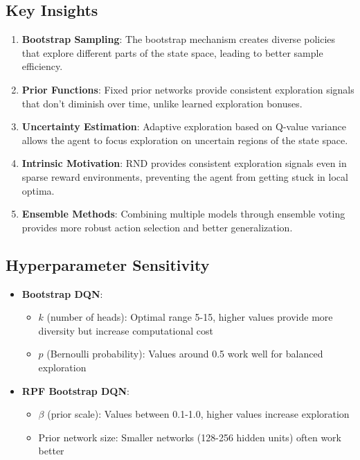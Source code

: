 \documentclass[12pt]{article}
\begin{document}
{{{\subsection{Key Insights}

\begin{enumerate}
    \item \textbf{Bootstrap Sampling}: The bootstrap mechanism creates diverse policies that explore different parts of the state space, leading to better sample efficiency.
    
    \item \textbf{Prior Functions}: Fixed prior networks provide consistent exploration signals that don't diminish over time, unlike learned exploration bonuses.
    
    \item \textbf{Uncertainty Estimation}: Adaptive exploration based on Q-value variance allows the agent to focus exploration on uncertain regions of the state space.
    
    \item \textbf{Intrinsic Motivation}: RND provides consistent exploration signals even in sparse reward environments, preventing the agent from getting stuck in local optima.
    
    \item \textbf{Ensemble Methods}: Combining multiple models through ensemble voting provides more robust action selection and better generalization.
\end{enumerate}

\subsection{Hyperparameter Sensitivity}

\begin{itemize}
    \item \textbf{Bootstrap DQN}: 
    \begin{itemize}
        \item $k$ (number of heads): Optimal range 5-15, higher values provide more diversity but increase computational cost
        \item $p$ (Bernoulli probability): Values around 0.5 work well for balanced exploration
    \end{itemize}
    
    \item \textbf{RPF Bootstrap DQN}:
    \begin{itemize}
        \item $\beta$ (prior scale): Values between 0.1-1.0, higher values increase exploration
        \item Prior network size: Smaller networks (128-256 hidden units) often work better
    \end{itemize}
    

\end{itemize}}}}
\end{document}
